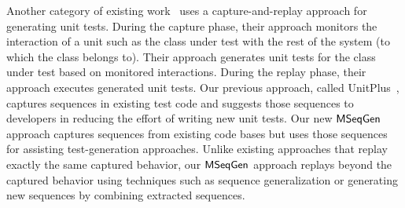Another category of existing work~\cite{Elbaum:capture, orso:capture, david:java} uses a capture-and-replay approach for generating unit tests. During the capture phase, their approach monitors the interaction of a unit such as the class under test with the rest of the system (to which the class belongs to). Their approach generates unit tests for the class under test based on monitored interactions. During the replay phase, their approach executes generated unit tests. Our previous approach, called UnitPlus~\cite{song07:unitplus}, captures sequences in existing test code and suggests those sequences to developers in reducing the effort of writing new unit tests. Our new $\textsf{MSeqGen} $ approach captures sequences from existing code bases but uses those sequences for assisting test-generation approaches. Unlike existing approaches that replay exactly the same captured behavior, our $\textsf{MSeqGen} $ approach replays beyond the captured behavior using techniques such as sequence generalization or generating new sequences by combining extracted sequences. 


